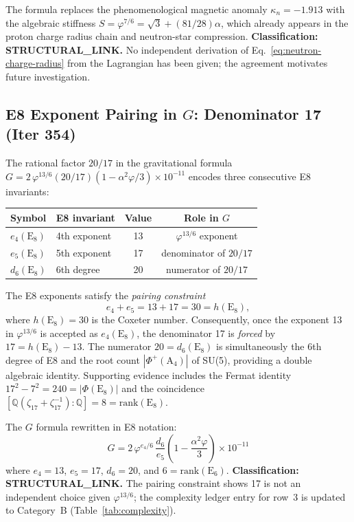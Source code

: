 \documentclass[aps,prd,twocolumn,superscriptaddress,floatfix,nofootinbib]{revtex4-2}
\theoremstyle{definition}
\theoremstyle{remark}
\newcommand{\vp}{\varphi}
\begin{document}
The formula replaces the phenomenological magnetic anomaly $\kappa_n = -1.913$ with
the algebraic stiffness $S = \vp^{7/6} = \sqrt{3} + (81/28)\alpha$, which already
appears in the proton charge radius chain and neutron-star compression.
\textbf{Classification: STRUCTURAL\_LINK.}  No independent derivation of Eq.~\eqref{eq:neutron-charge-radius}
from the Lagrangian has been given; the agreement motivates future investigation.

\subsection{E8 Exponent Pairing in $G$: Denominator 17 (Iter 354)}
\label{sec:denom17}

The rational factor $20/17$ in the gravitational formula
$G = 2\,\vp^{13/6}(20/17)(1-\alpha^2\vp/3)\times 10^{-11}$
encodes three consecutive E8 invariants:

\begin{center}
\small
\begin{tabular}{llcc}
\toprule
Symbol & E8 invariant & Value & Role in $G$ \\
\midrule
$e_4(\mathrm{E}_8)$ & 4th exponent & 13 & $\vp^{13/6}$ exponent \\
$e_5(\mathrm{E}_8)$ & 5th exponent & 17 & denominator of $20/17$ \\
$d_6(\mathrm{E}_8)$ & 6th degree & 20 & numerator of $20/17$ \\
\bottomrule
\end{tabular}
\end{center}

\noindent
The E8 exponents satisfy the \textit{pairing constraint}
\begin{equation}
  e_4 + e_5 = 13 + 17 = 30 = h(\mathrm{E}_8),
\end{equation}
where $h(\mathrm{E}_8)=30$ is the Coxeter number.  Consequently, once the exponent
13 in $\vp^{13/6}$ is accepted as $e_4(\mathrm{E}_8)$, the denominator 17 is \emph{forced}
by $17 = h(\mathrm{E}_8) - 13$.  The numerator $20 = d_6(\mathrm{E}_8)$ is simultaneously
the 6th degree of E8 and the root count $|\Phi^+(\mathrm{A}_4)|$ of SU(5), providing a
double algebraic identity.  Supporting evidence includes the Fermat identity
$17^2 - 7^2 = 240 = |\Phi(\mathrm{E}_8)|$ and the coincidence
$[\mathbb{Q}(\zeta_{17}+\zeta_{17}^{-1}):\mathbb{Q}] = 8 = \mathrm{rank}(\mathrm{E}_8)$.

The $G$ formula rewritten in E8 notation:
\begin{equation}
  G = 2\,\vp^{e_4/6}\,\frac{d_6}{e_5}\left(1-\frac{\alpha^2\vp}{3}\right)\times 10^{-11}
  \label{eq:G-e8-exponents}
\end{equation}
where $e_4=13$, $e_5=17$, $d_6=20$, and $6=\mathrm{rank}(\mathrm{E}_6)$.
\textbf{Classification: STRUCTURAL\_LINK.}  The pairing constraint shows 17 is not
an independent choice given $\vp^{13/6}$; the complexity ledger entry for row~3
is updated to Category~B (Table~\ref{tab:complexity}).
\end{document}
